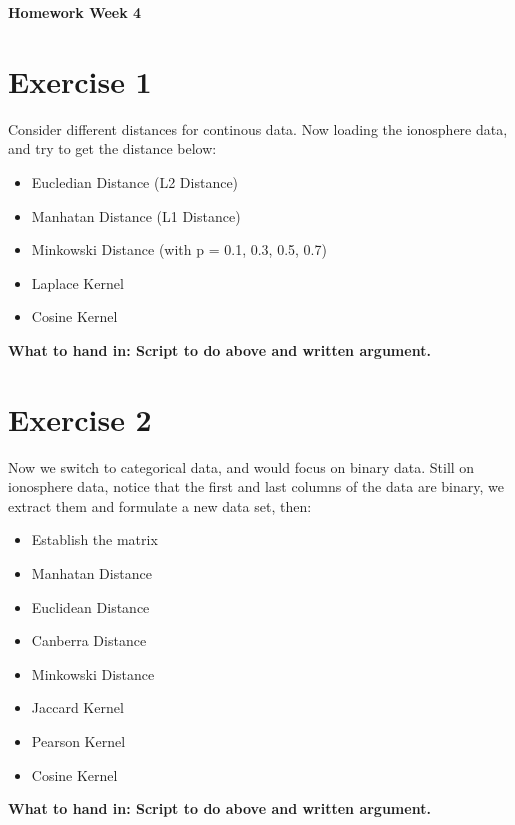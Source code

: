 \documentclass[11pt]{article}
\begin{document}
\begin{center}
	\bf \LARGE {Homework Week 4}
\end{center}

\section{Exercise 1}

Consider different distances for continous data. Now loading the ionosphere data, and try to get the distance below:

\begin{itemize}
	\item { Eucledian Distance (L2 Distance)}
	\item { Manhatan Distance (L1 Distance)}
	\item { Minkowski Distance (with p = 0.1, 0.3, 0.5, 0.7)}
	\item { Laplace Kernel }
	\item{ Cosine Kernel } \\
\end{itemize}
\noindent \textbf{What to hand in: Script to do above and written argument.}

\section{Exercise 2}

Now we switch to categorical data, and would focus on binary data. Still on ionosphere data, notice that the first and last columns of the data are binary, we extract them and formulate a new data set, then:

\begin{itemize}
\item{ Establish the matrix}
\item{ Manhatan Distance}
\item{ Euclidean Distance }
\item{ Canberra Distance }
\item{ Minkowski Distance }
\item{ Jaccard Kernel }
\item{ Pearson Kernel }
\item{ Cosine Kernel }
\end{itemize}


\noindent \textbf{What to hand in: Script to do above and written argument.}
\end{document}
